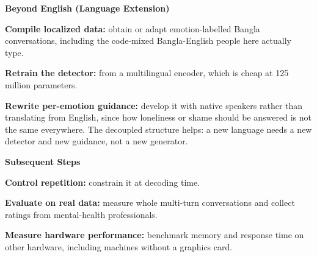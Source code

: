 \textbf{Beyond English (Language Extension)}

\textbf{Compile localized data:} obtain or adapt emotion-labelled Bangla conversations, including the code-mixed Bangla-English people here actually type.

\textbf{Retrain the detector:} from a multilingual encoder, which is cheap at 125 million parameters.

\textbf{Rewrite per-emotion guidance:} develop it with native speakers rather than translating from English, since how loneliness or shame should be answered is not the same everywhere. The decoupled structure helps: a new language needs a new detector and new guidance, not a new generator.

\textbf{Subsequent Steps}

\textbf{Control repetition:} constrain it at decoding time.

\textbf{Evaluate on real data:} measure whole multi-turn conversations and collect ratings from mental-health professionals.

\textbf{Measure hardware performance:} benchmark memory and response time on other hardware, including machines without a graphics card.
